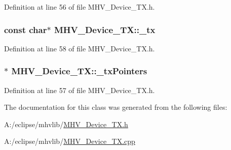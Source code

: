 \-Definition at line 56 of file \-M\-H\-V\-\_\-\-Device\-\_\-\-T\-X.\-h.

\hypertarget{class_m_h_v___device___t_x_ace8827a700dcc1a6a54e0bf80906085c}{
\subsubsection[{\-\_\-tx}]{\setlength{\rightskip}{0pt plus 5cm}const char$\ast$ {\bf \-M\-H\-V\-\_\-\-Device\-\_\-\-T\-X\-::\-\_\-tx}}}
\label{class_m_h_v___device___t_x_ace8827a700dcc1a6a54e0bf80906085c}


\-Definition at line 58 of file \-M\-H\-V\-\_\-\-Device\-\_\-\-T\-X.\-h.

\hypertarget{class_m_h_v___device___t_x_a54a8220b648f9e89a11e8273f91e75fb}{
\subsubsection[{\-\_\-tx\-Pointers}]{$\ast$ {\bf \-M\-H\-V\-\_\-\-Device\-\_\-\-T\-X\-::\-\_\-tx\-Pointers}}}
\label{class_m_h_v___device___t_x_a54a8220b648f9e89a11e8273f91e75fb}


\-Definition at line 57 of file \-M\-H\-V\-\_\-\-Device\-\_\-\-T\-X.\-h.



\-The documentation for this class was generated from the following files\-:\begin{DoxyCompactItemize}
\item 
\-A\-:/eclipse/mhvlib/\hyperlink{_m_h_v___device___t_x_8h}{\-M\-H\-V\-\_\-\-Device\-\_\-\-T\-X.\-h}\item 
\-A\-:/eclipse/mhvlib/\hyperlink{_m_h_v___device___t_x_8cpp}{\-M\-H\-V\-\_\-\-Device\-\_\-\-T\-X.\-cpp}\end{DoxyCompactItemize}
